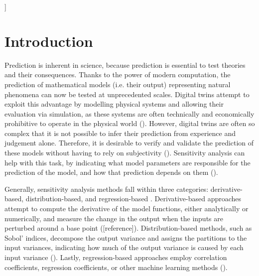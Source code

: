 \documentclass[twocolumn]{rps-esrel2022}
\begin{document}

]

\section{Introduction}

Prediction is inherent in science, because prediction is essential to test theories and their consequences.
Thanks to the power of modern computation, the prediction of mathematical models (i.e. their output) representing natural phenomena can now be tested at unprecedented scales.
Digital twins attempt to exploit this advantage by modelling physical systems and allowing their evaluation via simulation, as these systems are often technically and
economically prohibitive to operate in the physical world (\cite{wagg2020digital}).
However, digital twins are often so complex that it is not possible to infer their prediction from experience and judgement alone.
Therefore, it is desirable to verify and validate the prediction of these models without having to rely on subjectivity (\cite{JRC122132}).
Sensitivity analysis can help with this task, by indicating what model parameters are responsible for the prediction of the model, and how
that prediction depends on them (\cite{saltelli2004sensitivity}).

Generally, sensitivity analysis methods fall within three categories: derivative-based, distribution-based, and regression-based \cite{razavi2021future}.
Derivative-based approaches attempt to compute the derivative of the model functions, either analytically or numerically, and measure the change in
the output when the inputs are perturbed around a base point ([reference]).
Distribution-based methods, such as Sobol' indices, decompose the output variance and assigns the partitions to the input variances, indicating how much
of the output variance is caused by each input variance (\cite{saltelli2010variance}).
Lastly, regression-based approaches employ correlation coefficients, regression coefficients, or other machine learning methods (\cite{sudret2008global}).
\end{document}

